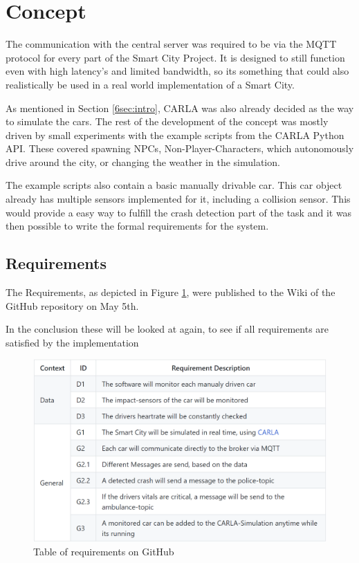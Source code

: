 \section{Concept}\label{6sec:concept}

The communication with the central server was required to be via the 
MQTT protocol for every part of the Smart City Project.
It is designed to still function even with high latency's 
and limited bandwidth, 
so its something that could also realistically be used 
in a real world implementation of a Smart City.

\noindent
As mentioned in Section \ref{6sec:intro},
CARLA was also already decided as the way to simulate the cars. 
The rest of the development of the concept was mostly driven by small experiments 
with the example scripts from the CARLA Python API. 
These covered spawning NPCs, Non-Player-Characters, 
which autonomously drive around the city,
or changing the weather in the simulation.

\noindent
The example scripts also contain a basic manually drivable car.
This car object already has multiple sensors implemented for it,
including a collision sensor.
This would provide a easy way to fulfill the crash detection part of the task
and it was then possible to write the formal requirements for the system.

\vspace{-18pt}
\subsection{Requirements}
The Requirements, as depicted in Figure \ref{6fig:reqTable}, 
were published to the Wiki of the GitHub repository on May 5th.

\noindent
In the conclusion these will be looked at again, 
to see if all requirements are satisfied by the implementation

\vspace{-4pt}
\begin{figure}[H]
  \centering\includegraphics[width=1.0\linewidth]{chapters/chapter6_bruno/Figures/requirements.png}
  \caption{Table of requirements on GitHub}
  \label{6fig:reqTable}
\end{figure}
\vspace{-34pt}
